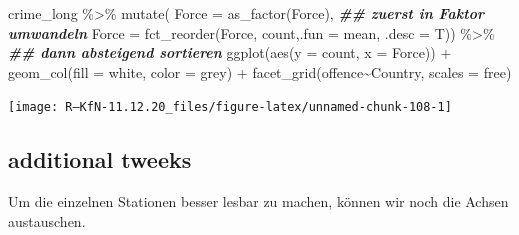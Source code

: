 \documentclass[
]{book}
\newenvironment{Shaded}{\begin{snugshade}}{\end{snugshade}}
\newcommand{\AttributeTok}[1]{\textcolor[rgb]{0.77,0.63,0.00}{#1}}
\newcommand{\DocumentationTok}[1]{\textcolor[rgb]{0.56,0.35,0.01}{\textbf{\textit{#1}}}}
\newcommand{\FunctionTok}[1]{\textcolor[rgb]{0.00,0.00,0.00}{#1}}
\newcommand{\NormalTok}[1]{#1}
\newcommand{\SpecialCharTok}[1]{\textcolor[rgb]{0.00,0.00,0.00}{#1}}
\newcommand{\StringTok}[1]{\textcolor[rgb]{0.31,0.60,0.02}{#1}}
\begin{document}
\begin{Shaded}
\begin{Highlighting}[]
\NormalTok{crime\_long }\SpecialCharTok{\%\textgreater{}\%} 
  \FunctionTok{mutate}\NormalTok{(}
      \AttributeTok{Force =} \FunctionTok{as\_factor}\NormalTok{(Force), }\DocumentationTok{\#\# zuerst in Faktor umwandeln}
      \AttributeTok{Force =} \FunctionTok{fct\_reorder}\NormalTok{(Force, count,}\AttributeTok{.fun =}\NormalTok{ mean, }\AttributeTok{.desc =}\NormalTok{ T)) }\SpecialCharTok{\%\textgreater{}\%} \DocumentationTok{\#\# dann absteigend sortieren}
\FunctionTok{ggplot}\NormalTok{(}\FunctionTok{aes}\NormalTok{(}\AttributeTok{y =}\NormalTok{ count,}
             \AttributeTok{x =}\NormalTok{ Force)) }\SpecialCharTok{+}
  \FunctionTok{geom\_col}\NormalTok{(}\AttributeTok{fill =} \StringTok{\textquotesingle{}white\textquotesingle{}}\NormalTok{,}
           \AttributeTok{color =} \StringTok{\textquotesingle{}grey\textquotesingle{}}\NormalTok{) }\SpecialCharTok{+}
  \FunctionTok{facet\_grid}\NormalTok{(offence}\SpecialCharTok{\textasciitilde{}}\NormalTok{Country, }
             \AttributeTok{scales =} \StringTok{\textquotesingle{}free\textquotesingle{}}\NormalTok{)}
\end{Highlighting}
\end{Shaded}

\begin{center}\texttt{[image: R---KfN-11.12.20\_files/figure-latex/unnamed-chunk-108-1]} \end{center}

\hypertarget{additional-tweeks-1}{%
\subsection{additional tweeks}\label{additional-tweeks-1}}

Um die einzelnen Stationen besser lesbar zu machen, können wir noch die Achsen austauschen.
\end{document}
